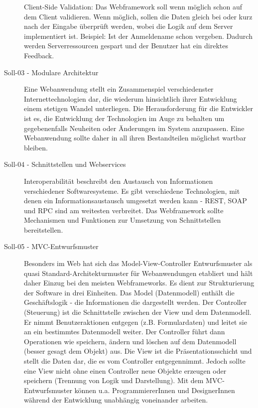 \begin{description}
    Client-Side Validation: Das Webframework soll wenn möglich schon auf dem
    Client validieren. Wenn möglich, sollen die Daten gleich bei oder kurz nach
    der Eingabe überprüft werden, wobei die Logik auf dem Server implementiert
    ist. Beispiel: Ist der Anmeldename schon vergeben. Dadurch werden
    Serverressourcen gespart und der Benutzer hat ein direktes Feedback.

    \item[Soll-03 - Modulare Architektur\label{itm:Soll-03}]

    Eine Webanwendung stellt ein Zusammenspiel verschiedenster
    Internettechnologien dar, die wiederum hinsichtlich ihrer Entwicklung einem
    stetigen Wandel unterliegen. Die Herausforderung für die Entwickler ist es,
    die Entwicklung der Technologien im Auge zu behalten um gegebenenfalls
    Neuheiten oder Änderungen im System anzupassen. Eine Webanwendung sollte
    daher in all ihren Bestandteilen möglichst wartbar bleiben.

    \item[Soll-04 - Schnittstellen und Webservices\label{itm:Soll-04}]

    Interoperabilität beschreibt den Austausch von Informationen verschiedener
    Softwaresysteme. Es gibt verschiedene Technologien, mit denen ein
    Informationsaustausch umgesetzt werden kann - REST, SOAP und RPC sind am
    weitesten verbreitet. Das Webframework sollte Mechanismen und Funktionen
    zur Umsetzung von Schnittstellen bereitstellen.
    
    \item[Soll-05 - MVC-Entwurfsmuster\label{itm:Soll-05}]
    Besonders im Web hat sich das Model-View-Controller Entwurfsmuster als
    quasi Standard-Architekturmuster für Webanwendungen etabliert und hält
    daher Einzug bei den meisten Webframeworks. Es dient zur Strukturierung der
    Software in drei Einheiten. Das Model (Datenmodell) enthält die
    Geschäftslogik - die Informationen die dargestellt werden. Der Controller
    (Steuerung) ist die Schnittstelle zwischen der View und dem Datenmodell. Er
    nimmt Benutzeraktionen entgegen (z.B. Formulardaten) und leitet sie an ein
    bestimmtes Datenmodell weiter. Der Controller führt dann Operationen wie
    speichern, ändern und löschen auf dem Datenmodell (besser gesagt dem
    Objekt) aus. Die View ist die Präsentationsschicht und stellt die Daten
    dar, die es vom Controller entgegennimmt. Jedoch sollte eine View nicht
    ohne einen Controller neue Objekte erzeugen oder speichern (Trennung von
    Logik und Darstellung). Mit dem MVC-Entwurfsmuster können u.a.
    ProgrammiererInnen und DesignerInnen während der Entwicklung unabhängig
    voneinander arbeiten.


\end{description}
